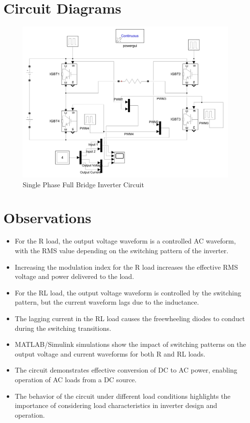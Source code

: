 \documentclass[12pt]{article}
\begin{document}
\section*{Circuit Diagrams}
\begin{figure}[H]
    \centering
    \includegraphics[width=\textwidth]{ckt.png}
    \caption{Single Phase Full Bridge Inverter Circuit}
\end{figure}

\section*{Observations}
\begin{itemize}
    \item For the R load, the output voltage waveform is a controlled AC waveform, with the RMS value depending on the switching pattern of the inverter.
    \item Increasing the modulation index for the R load increases the effective RMS voltage and power delivered to the load.
    \item For the RL load, the output voltage waveform is controlled by the switching pattern, but the current waveform lags due to the inductance.
    \item The lagging current in the RL load causes the freewheeling diodes to conduct during the switching transitions.
    \item MATLAB/Simulink simulations show the impact of switching patterns on the output voltage and current waveforms for both R and RL loads.
    \item The circuit demonstrates effective conversion of DC to AC power, enabling operation of AC loads from a DC source.
    \item The behavior of the circuit under different load conditions highlights the importance of considering load characteristics in inverter design and operation.
\end{itemize}
\end{document}
